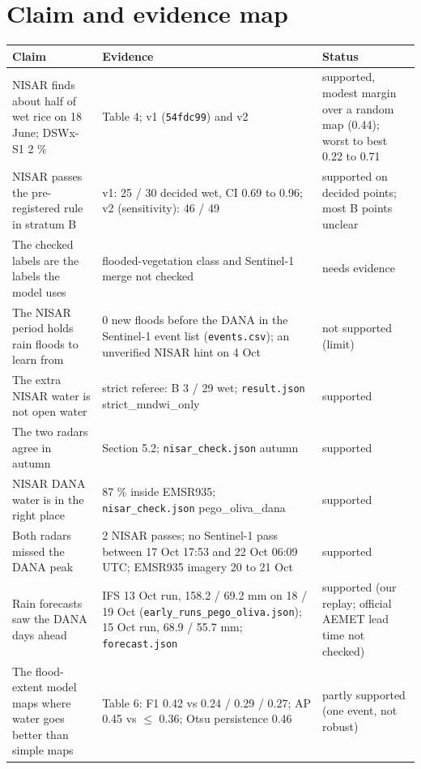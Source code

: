 \documentclass[10pt,twocolumn]{article}
\begin{document}
\section{Claim and evidence map}
\begin{center}
\footnotesize
\begin{tabularx}{\textwidth}{LLL}
\toprule
\textbf{Claim} & \textbf{Evidence} & \textbf{Status} \\
\midrule
{}NISAR finds about half of wet rice on 18 June; DSWx-S1 2 \% & Table 4; v1 (\texttt{54fdc99}) and v2 & supported, modest margin over a random map (0.44); worst to best 0.22 to 0.71 \\
{}NISAR passes the pre-registered rule in stratum B & v1: 25 / 30 decided wet, CI 0.69 to 0.96; v2 (sensitivity): 46 / 49 & supported on decided points; most B points unclear \\
{}The checked labels are the labels the model uses & flooded-vegetation class and Sentinel-1 merge not checked & needs evidence \\
{}The NISAR period holds rain floods to learn from & 0 new floods before the DANA in the Sentinel-1 event list (\texttt{events.\allowbreak{}csv}); an unverified NISAR hint on 4 Oct & not supported (limit) \\
{}The extra NISAR water is not open water & strict referee: B 3 / 29 wet; \texttt{result.\allowbreak{}json} strict\_mndwi\_only & supported \\
{}The two radars agree in autumn & Section 5.2; \texttt{nisar\_\allowbreak{}check.\allowbreak{}json} autumn & supported \\
{}NISAR DANA water is in the right place & 87 \% inside EMSR935; \texttt{nisar\_\allowbreak{}check.\allowbreak{}json} pego\_oliva\_dana & supported \\
{}Both radars missed the DANA peak & 2 NISAR passes; no Sentinel-1 pass between 17 Oct 17:53 and 22 Oct 06:09 UTC; EMSR935 imagery 20 to 21 Oct & supported \\
{}Rain forecasts saw the DANA days ahead & IFS 13 Oct run, 158.2 / 69.2 mm on 18 / 19 Oct (\texttt{early\_\allowbreak{}runs\_\allowbreak{}pego\_\allowbreak{}oliva.\allowbreak{}json}); 15 Oct run, 68.9 / 55.7 mm; \texttt{forecast.\allowbreak{}json} & supported (our replay; official AEMET lead time not checked) \\
{}The flood-extent model maps where water goes better than simple maps & Table 6: F1 0.42 vs 0.24 / 0.29 / 0.27; AP 0.45 vs $\leq$ 0.36; Otsu persistence 0.46 & partly supported (one event, not robust) \\

\end{tabularx}
\end{center}
\end{document}
